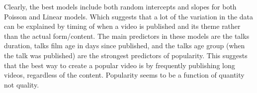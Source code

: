 
Clearly, the best models include both random intercepts and slopes for both Poisson and Linear models. Which suggests that a lot of the variation in the data can be explained by timing of when a video is published and its theme rather than the actual form/content. The main predictors in these models are the talks duration, talks film age in days since published, and the talks age group (when the talk was published) are the strongest predictors of popularity. This suggests that the best way to create a popular video is by frequently publishing long videos, regardless of the content. Popularity seems to be a function of quantity not quality.
















